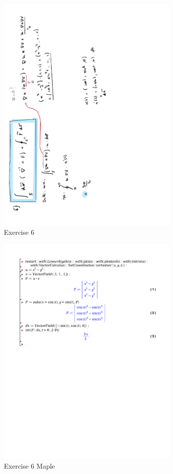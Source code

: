 \documentclass[a4paper]{report}
\begin{document}
\begin{figure}[H]
	\centering
	\includegraphics[angle=-90,width=0.8\textwidth]{assets/huis_7_ex_6.pdf}
	\caption{Exercise 6}
\end{figure}

\begin{figure}[H]
	\centering
	\includegraphics[width=0.8\textwidth]{exercises/huis_7_ex_6.pdf}
	\caption{Exercise 6 Maple}
	\label{fig:huis_7_ex_6}
\end{figure}
\end{document}
